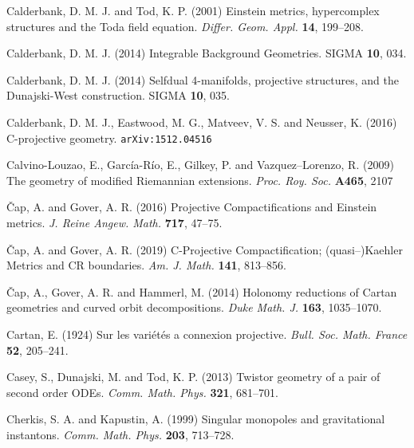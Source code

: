 \begin{thebibliography}{}
 Calderbank, D. M. J. and Tod,  K. P. (2001)
Einstein metrics, hypercomplex structures and the Toda field equation.
\textit{Differ. Geom. Appl.} {\bf 14},  199--208.

 Calderbank, D. M. J. (2014)
Integrable Background Geometries. SIGMA {\bf 10}, 034.

 Calderbank, D. M. J. (2014)
Selfdual 4-manifolds, projective structures, and the Dunajski-West construction. SIGMA {\bf 10}, 035.

 Calderbank,  D. M. J.,  Eastwood, M. G.,  Matveev, V. S. and 
Neusser, K.  (2016) C-projective geometry. {\tt arXiv:1512.04516}

 Calvino-Louzao, E., Garc\' ia-R\' io, E., Gilkey, P. and Vazquez--Lorenzo, R. (2009) The geometry of modified Riemannian extensions. \textit{Proc. Roy. Soc.} {\bf A465}, 2107

 \v Cap, A. and Gover, A. R. (2016)
Projective Compactifications and Einstein metrics.
\textit{J. Reine Angew. Math.} {\bf 717},  47--75.

 \v Cap, A. and Gover, A. R. (2019)
C-Projective Compactification; (quasi--)Kaehler Metrics and CR boundaries.
{\em  Am. J. Math.} {\bf 141}, 813--856.

 \v Cap, A., Gover, A. R. and Hammerl, M. (2014) 
  Holonomy reductions of Cartan geometries and curved orbit
  decompositions. {\em Duke Math. J.} 
{\bf 163}, 1035--1070.
 
  



 Cartan, E. (1924)
Sur les vari\'et\'es a connexion projective.
\textit{Bull. Soc. Math. France} {\bf 52}, 205--241.


 Casey, S., Dunajski, M. and Tod, K. P. (2013)
Twistor geometry of a pair of second order ODEs. 
\textit{Comm. Math. Phys.} { \bf 321}, 681--701.



 Cherkis, S. A.  and Kapustin, A. (1999) Singular monopoles and gravitational
instantons. \textit{Comm. Math. Phys.} {\bf 203}, 713--728.



\end{thebibliography}

